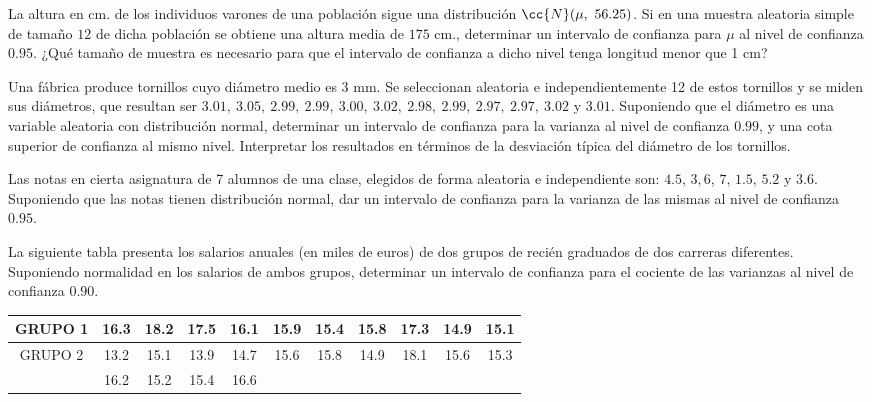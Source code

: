 \begin{ejercicio}
    La altura en cm. de los individuos varones de una población sigue una distribución $\cc{N}(\mu,\ 56.25)$. Si en una muestra aleatoria simple de tamaño $12$ de dicha población se obtiene una altura media de $175$ cm., determinar un intervalo de confianza para $\mu$ al nivel de confianza $0.95$. ¿Qué tamaño de muestra es necesario para que el intervalo de confianza a dicho nivel tenga longitud menor que 1 cm?
\end{ejercicio}

\begin{ejercicio}
    Una fábrica produce tornillos cuyo diámetro medio es $3$ mm. Se seleccionan aleatoria e independientemente 12 de estos tornillos y se miden sus diámetros, que resultan ser $3.01,\ 3.05,\ 2.99,\ 2.99,\ 3.00,\ 3.02,\ 2.98,\ 2.99,\ 2.97,\ 2.97,\ 3.02$ y $3.01$. Suponiendo que el diámetro es una variable aleatoria con distribución normal, determinar un intervalo de confianza para la varianza al nivel de confianza $0.99$, y una cota superior de confianza al mismo nivel. Interpretar los resultados en términos de la desviación típica del diámetro de los tornillos.
\end{ejercicio}

\begin{ejercicio}
    Las notas en cierta asignatura de 7 alumnos de una clase, elegidos de forma aleatoria e independiente son: $4.5$, $3, 6$, $7$, $1.5$, $5.2$ y $3.6$. Suponiendo que las notas tienen distribución normal, dar un intervalo de confianza para la varianza de las mismas al nivel de confianza $0.95$.
\end{ejercicio}

\begin{ejercicio}
    La siguiente tabla presenta los salarios anuales (en miles de euros) de dos grupos de recién graduados de dos carreras diferentes. Suponiendo normalidad en los salarios de ambos grupos, determinar un intervalo de confianza para el cociente de las varianzas al nivel de confianza $0.90$.
    \begin{table}[H]
    \centering
    \begin{tabular}{|c|cccccccccc|}
        \hline 
        GRUPO 1 & 16.3 & 18.2 & 17.5 & 16.1 & 15.9 & 15.4 & 15.8 & 17.3 & 14.9 & 15.1 \\
        \hline
        GRUPO 2 & 13.2 & 15.1 & 13.9 & 14.7 & 15.6 & 15.8 & 14.9 & 18.1 & 15.6 & 15.3 \\ 
                & 16.2 & 15.2 & 15.4 & 16.6 & & & & & &  \\
        \hline
    \end{tabular}
    \end{table}
\end{ejercicio}

